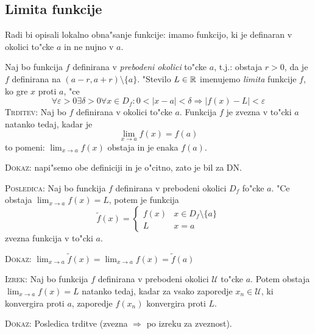 \subsection{Limita funkcije}
Radi bi opisali lokalno obna"sanje funkcije: imamo funkcijo, ki je definaran v okolici to"cke $a$ in ne nujno v $a$.

 Naj bo funkcija $f$ definirana v \emph{prebodeni okolici} to"cke $a$, t.j.: obstaja $r > 0$, da je $f$ definirana na $(a - r, a + r) \setminus \{a\}$. "Stevilo $L \in \mathbb{R}$ imenujemo \emph{limita} funkcije $f$, ko gre $x$ proti $a$, "ce
\begin{equation*}
\forall \varepsilon > 0 \exists \delta > 0 \forall x \in D_f: 0 < |x - a| < \delta \Rightarrow |f(x) - L| < \varepsilon
\end{equation*}
%
\textsc{Trditev:} Naj bo $f$ definirana v okolici to"cke $a$. Funkcija $f$ je zvezna v to"cki $a$ natanko tedaj, kadar je
\begin{equation*}
\lim_{x \to a} f(x) = f(a)
\end{equation*}
to pomeni: $\lim_{x \to a} f(x)$ obstaja in je enaka $f(a)$.

\textsc{Dokaz:} napi"semo obe definiciji in je o"citno, zato je bil za DN.

\textsc{Posledica:} Naj bo funckija $f$ definirana v prebodeni okolici $D_f$ fo"cke $a$. "Ce obstaja $\lim_{x \to a} f(x) = L$, potem je funkcija
\begin{equation*}
\widetilde{f}(x) = \begin{cases}
f(x) & x \in D_f \setminus \{a\} \\
L & x = a
\end{cases}
\end{equation*}
zvezna funkcija v to"cki $a$.

\textsc{Dokaz:} $\lim_{x \to a} \widetilde{f} (x) = \lim_{x \to a} f(x) = \widetilde{f}(a)$

\textsc{Izrek:} Naj bo funkcija $f$ definirana v prebodeni okolici $\mathcal{U}$ to"cke $a$. Potem obstaja $\lim_{x \to a} f(x) = L$ natanko tedaj, kadar za vsako zaporedje $x_n \in \mathcal{U}$, ki konvergira proti $a$, zaporedje $f(x_n)$ konvergira proti $L$.

\textsc{Dokaz:} Posledica trditve (zvezna $\Rightarrow$ po izreku za zveznost).

